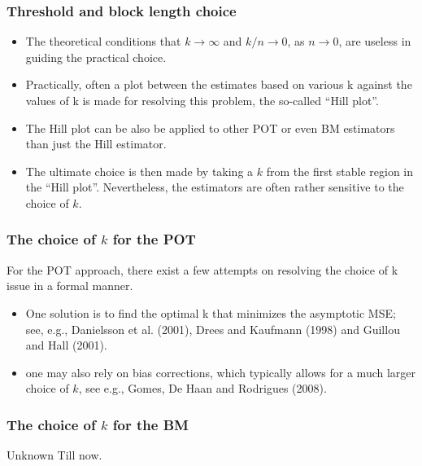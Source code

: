 \documentclass{beamer}
\begin{document}
\begin{frame}
    \frametitle{Threshold and block length choice}

    \begin{itemize}
        \item The theoretical conditions that $k\to \infty$ and $k/n\to 0$, as $n \to 0$, are useless in guiding the practical choice. 
        \item Practically, often a plot between the estimates based on various k against the values
        of k is made for resolving this problem, the so-called “Hill plot”.
        \item The Hill plot can be also be applied to other POT or even BM estimators than
        just the Hill estimator.
        \item The ultimate choice is then made by taking a $k$ from the first stable
        region in the “Hill plot”. Nevertheless, the estimators are often rather sensitive to the choice of $k$.
    \end{itemize}

\end{frame}

\begin{frame}
    \frametitle{The choice of $k$ for the POT}
    For the POT approach, there exist a few attempts on resolving the choice of k issue in a formal manner.
\begin{itemize}
    \item One solution is to find the optimal k that minimizes the asymptotic MSE; see, e.g., Danielsson et al. (2001), Drees and Kaufmann (1998) and Guillou and Hall (2001).
    \item one may also rely on bias corrections, which typically allows
    for a much larger choice of $k$, see e.g., Gomes, De Haan and Rodrigues (2008).
\end{itemize}
    

\end{frame}


\begin{frame}
    \frametitle{The choice of $k$ for the BM}
    \begin{center}
        Unknown Till now.
    \end{center}

    

\end{frame}
\end{document}
